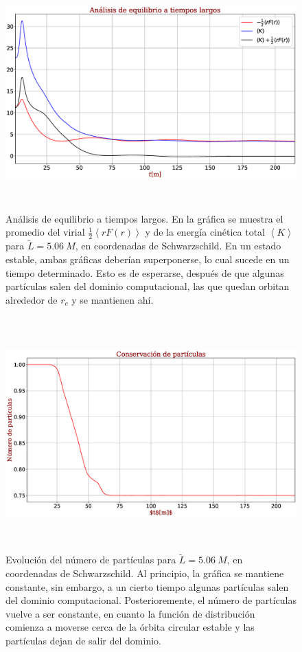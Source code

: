 \documentclass[11pt,twoside,openright,spanish]{report}
\numberwithin{equation}{chapter}
\numberwithin{figure}{chapter}
\numberwithin{table}{chapter}
\begin{document}
\begin{figure}[H]
	\centering
	\includegraphics[height=9cm]{graphs_study/LmayorSchGraphs/stabilitySchMayor.eps}
	\caption{Análisis de equilibrio a tiempos largos. En la gráfica se muestra el promedio del virial $\frac{1}{2}\left<rF(r)\right>$ y de la energía cinética total $\left<K\right>$ para $\tilde{L}=5.06\ M$, en coordenadas de Schwarzschild. En un estado estable, ambas gráficas deberían superponerse, lo cual sucede en un tiempo determinado. Esto es de esperarse, después de que algunas partículas salen del dominio computacional, las que quedan orbitan alrededor de $r_c$ y se mantienen ahí.}
	\label{stabilitySchmayor}
\end{figure}

\begin{figure}[H]
	\centering
	\includegraphics[height=9cm]{graphs_study/LmayorSchGraphs/numpartSchMayor.eps}
	\caption{Evolución del número de partículas para $\tilde{L}=5.06\ M$, en coordenadas de Schwarzschild. Al principio, la gráfica se mantiene constante, sin embargo, a un cierto tiempo algunas partículas salen del dominio computacional. Posterioremente, el número de partículas vuelve a ser constante, en cuanto la función de distribución comienza a moverse cerca de la órbita circular estable y las partículas dejan de salir del dominio.}
	\label{numpartSchMayor}
\end{figure}
\end{document}
